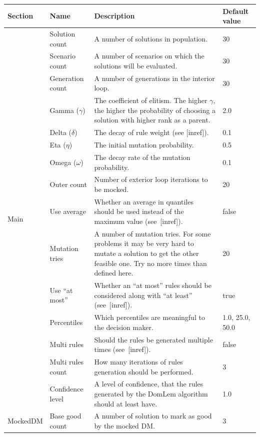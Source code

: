 \begin{table}
  \centering
  \begin{tabular}{l l p{7cm} l}
    \hline
   Section &  Name & Description & Default value \\
    \hline
    \hline
    \multirow{15}{*}{Main} & 
    Solution count & A number of solutions in population. & 30 \\
    & Scenario count & A number of scenarios on which the solutions will be evaluated.  & 30 \\
    & Generation count & A number of generations in the interior loop. & 30 \\
    & Gamma ($\gamma$) & The coefficient of elitism. The higher $\gamma$, the
      higher the probability of choosing a solution with higher rank as a
      parent. & 2.0  \\
    & Delta ($\delta$) & The decay of rule weight (see [inref]). & 0.1  \\
    & Eta ($\eta$) & The initial mutation probability.  & 0.5    \\
    & Omega ($\omega$)& The decay rate of the mutation probability. & 0.1  \\
    & Outer count & Number of exterior loop iterations to be mocked. & 20 \\
    & Use average & Whether an average in quantiles should be used instead of
      the maximum value (see~[inref]). & false  \\
    & Mutation tries & A number of mutation tries. For some problems it may be
      very hard to mutate a solution to get the other feasible one. Try no more
      times than defined here.  & 20  \\
    & Use ``at most'' & Whether an ``at most'' rules should be considered
    along with ``at least'' (see~[inref]). & true \\
    & Percentiles & Which percentiles are meaningful to the decision maker. & 1.0, 25.0, 50.0  \\
    & Multi rules & Should the rules be generated multiple times (see~[inref]). & false \\
    & Multi rules count & How many iterations of rules generation should be performed. & 3 \\
    \hline
    DomLem & Confidence level & A level of confidence, that the rules generated by the
    DomLem algorithm should at least have. & 1.0 \\
    \hline
    \multirow{3}{*}{MockedDM} & Base good count & A number of solution to mark
    as good by the mocked DM. & 3 \\

\end{tabular}
\end{table}
